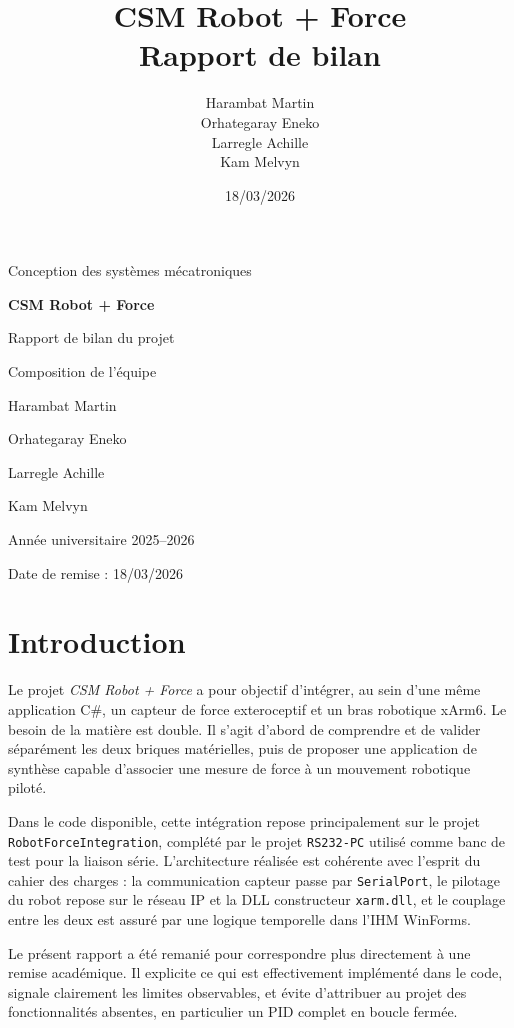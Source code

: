 \documentclass[11pt,a4paper]{article}
\title{CSM Robot + Force\\Rapport de bilan}
\author{Harambat Martin\\Orhategaray Eneko\\Larregle Achille\\Kam Melvyn}
\date{18/03/2026}
\begin{document}
\begin{titlepage}
\centering
\vspace*{2cm}
{\Large Conception des syst\`emes m\'ecatroniques\par}
\vspace{1.2cm}
{\huge \textbf{CSM Robot + Force}\par}
\vspace{0.4cm}
{\Large Rapport de bilan du projet\par}
\vspace{2cm}

{\large Composition de l'\'equipe\par}
\vspace{0.5cm}
{\Large
Harambat Martin\par
Orhategaray Eneko\par
Larregle Achille\par
Kam Melvyn\par
}

\vfill

{\large Ann\'ee universitaire 2025--2026\par}
{\large Date de remise : 18/03/2026\par}
\end{titlepage}

\tableofcontents
\clearpage

\section{Introduction}
Le projet \emph{CSM Robot + Force} a pour objectif d'int\'egrer, au sein d'une m\^eme application C\#, un capteur de force exteroceptif et un bras robotique xArm6. Le besoin de la mati\`ere est double. Il s'agit d'abord de comprendre et de valider s\'epar\'ement les deux briques mat\'erielles, puis de proposer une application de synth\`ese capable d'associer une mesure de force \`a un mouvement robotique pilot\'e.

Dans le code disponible, cette int\'egration repose principalement sur le projet \texttt{RobotForceIntegration}, compl\'et\'e par le projet \texttt{RS232-PC} utilis\'e comme banc de test pour la liaison s\'erie. L'architecture r\'ealis\'ee est coh\'erente avec l'esprit du cahier des charges : la communication capteur passe par \texttt{SerialPort}, le pilotage du robot repose sur le r\'eseau IP et la DLL constructeur \texttt{xarm.dll}, et le couplage entre les deux est assur\'e par une logique temporelle dans l'IHM WinForms.

Le pr\'esent rapport a \'et\'e remani\'e pour correspondre plus directement \`a une remise acad\'emique. Il explicite ce qui est effectivement impl\'ement\'e dans le code, signale clairement les limites observables, et \'evite d'attribuer au projet des fonctionnalit\'es absentes, en particulier un PID complet en boucle ferm\'ee.
\end{document}
